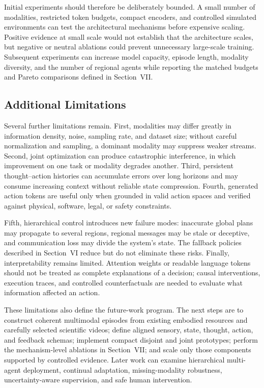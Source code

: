 Initial experiments should therefore be deliberately bounded. A small number of modalities, restricted token budgets, compact encoders, and controlled simulated environments can test the architectural mechanisms before expensive scaling. Positive evidence at small scale would not establish that the architecture scales, but negative or neutral ablations could prevent unnecessary large-scale training. Subsequent experiments can increase model capacity, episode length, modality diversity, and the number of regional agents while reporting the matched budgets and Pareto comparisons defined in Section~VII.

\subsection{\textbf{Additional Limitations}}

Several further limitations remain. First, modalities may differ greatly in information density, noise, sampling rate, and dataset size; without careful normalization and sampling, a dominant modality may suppress weaker streams. Second, joint optimization can produce catastrophic interference, in which improvement on one task or modality degrades another. Third, persistent thought--action histories can accumulate errors over long horizons and may consume increasing context without reliable state compression. Fourth, generated action tokens are useful only when grounded in valid action spaces and verified against physical, software, legal, or safety constraints.

Fifth, hierarchical control introduces new failure modes: inaccurate global plans may propagate to several regions, regional messages may be stale or deceptive, and communication loss may divide the system's state. The fallback policies described in Section~VI reduce but do not eliminate these risks. Finally, interpretability remains limited. Attention weights or readable language tokens should not be treated as complete explanations of a decision; causal interventions, execution traces, and controlled counterfactuals are needed to evaluate what information affected an action.

These limitations also define the future-work program. The next steps are to construct coherent multimodal episodes from existing embodied resources and carefully selected scientific videos; define aligned sensory, state, thought, action, and feedback schemas; implement compact disjoint and joint prototypes; perform the mechanism-level ablations in Section~VII; and scale only those components supported by controlled evidence. Later work can examine hierarchical multi-agent deployment, continual adaptation, missing-modality robustness, uncertainty-aware supervision, and safe human intervention.

